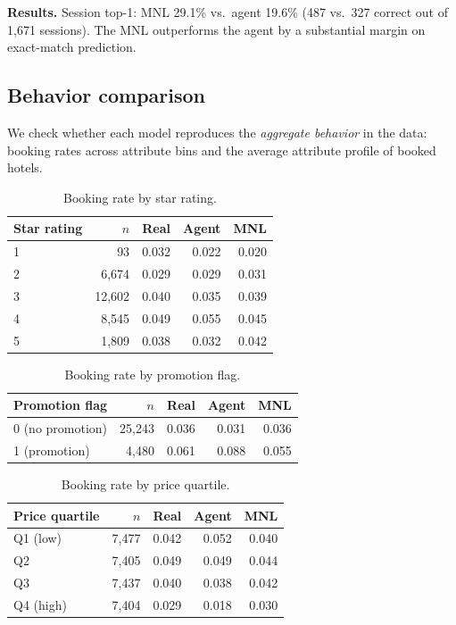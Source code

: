 \documentclass[11pt]{article}
\begin{document}
\textbf{Results.} Session top-1: MNL 29.1\% vs.\ agent 19.6\% (487 vs.\ 327 correct out of 1,671 sessions). The MNL outperforms the agent by a substantial margin on exact-match prediction.

\subsection*{Behavior comparison}

We check whether each model reproduces the \textit{aggregate behavior} in the data: booking rates across attribute bins and the average attribute profile of booked hotels.

\begin{table}[h]
\centering
\begin{tabular}{lrrrr}
\toprule
Star rating & $n$ & Real & Agent & MNL \\
\midrule
1 & 93     & 0.032 & 0.022 & 0.020 \\
2 & 6,674  & 0.029 & 0.029 & 0.031 \\
3 & 12,602 & 0.040 & 0.035 & 0.039 \\
4 & 8,545  & 0.049 & 0.055 & 0.045 \\
5 & 1,809  & 0.038 & 0.032 & 0.042 \\
\bottomrule
\end{tabular}
\caption{Booking rate by star rating.}
\end{table}

\begin{table}[h]
\centering
\begin{tabular}{lrrrr}
\toprule
Promotion flag & $n$ & Real & Agent & MNL \\
\midrule
0 (no promotion) & 25,243 & 0.036 & 0.031 & 0.036 \\
1 (promotion)    &  4,480 & 0.061 & 0.088 & 0.055 \\
\bottomrule
\end{tabular}
\caption{Booking rate by promotion flag.}
\end{table}

\begin{table}[h]
\centering
\begin{tabular}{lrrrr}
\toprule
Price quartile & $n$ & Real & Agent & MNL \\
\midrule
Q1 (low)  & 7,477 & 0.042 & 0.052 & 0.040 \\
Q2        & 7,405 & 0.049 & 0.049 & 0.044 \\
Q3        & 7,437 & 0.040 & 0.038 & 0.042 \\
Q4 (high) & 7,404 & 0.029 & 0.018 & 0.030 \\
\bottomrule
\end{tabular}
\caption{Booking rate by price quartile.}
\end{table}
\end{document}
